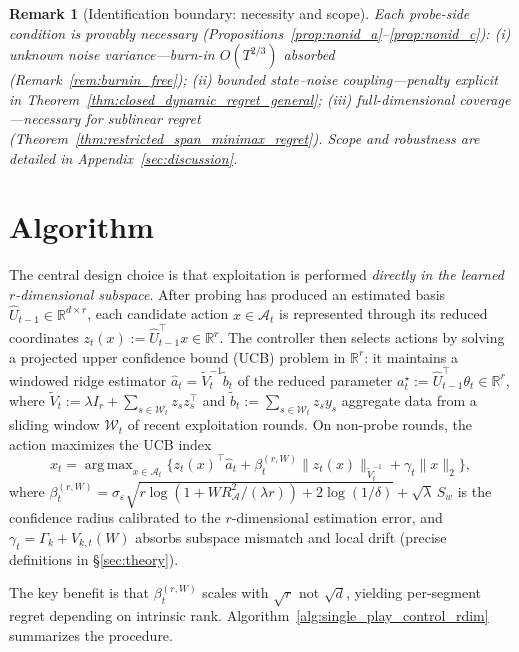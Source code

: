 \documentclass{article}
\newcommand{\R}{\mathbb{R}}
\newcommand{\cA}{\mathcal{A}}
\DeclareMathOperator*{\argmax}{arg\,max}
\newtheorem{remark}{Remark}
\begin{document}
\begin{remark}[Identification boundary: necessity and scope]
  \label{rem:necessity_compact}
  Each probe-side condition is provably necessary (Propositions~\ref{prop:nonid_a}--\ref{prop:nonid_c}):
  \emph{(i)} unknown noise variance---burn-in $O(T^{2/3})$ absorbed (Remark~\ref{rem:burnin_free});
  \emph{(ii)} bounded state--noise coupling---penalty explicit in Theorem~\ref{thm:closed_dynamic_regret_general};
  \emph{(iii)} full-dimensional coverage---necessary for sublinear regret (Theorem~\ref{thm:restricted_span_minimax_regret}).
  Scope and robustness are detailed in Appendix~\ref{sec:discussion}.
  \end{remark}



\section{Algorithm}
\label{sec:algorithm}

The central design choice is that exploitation is performed \emph{directly in the learned $r$-dimensional subspace}. After probing has produced an estimated basis $\widehat U_{t-1}\in\R^{d\times r}$, each candidate action $x\in\cA_t$ is represented through its reduced coordinates $z_t(x) := \widehat U_{t-1}^\top x \in \R^r.$
The controller then selects actions by solving a projected upper confidence bound (UCB) problem in $\R^r$: it maintains a windowed ridge estimator $\widehat a_t = \widetilde V_t^{-1}\widetilde b_t$ of the reduced parameter $a_t^\star := \widehat U_{t-1}^\top \theta_t \in \R^r$, where $\widetilde V_t := \lambda I_r + \sum_{s \in \mathcal{W}_t} z_s z_s^\top$ and $\widetilde b_t := \sum_{s \in \mathcal{W}_t} z_s y_s$ aggregate data from a sliding window $\mathcal{W}_t$ of recent exploitation rounds. On non-probe rounds, the action maximizes the UCB index
\[
x_t = \argmax_{x \in \cA_t}\bigl\{z_t(x)^\top \widehat a_t + \beta_t^{(r,W)}\|z_t(x)\|_{\widetilde V_t^{-1}} + \gamma_t\|x\|_2\bigr\},
\]
where $\beta_t^{(r,W)} = \sigma_\varepsilon\sqrt{r\log(1 + WR_{\cA}^2/(\lambda r)) + 2\log(1/\delta)} + \sqrt{\lambda}\,S_w$ is the confidence radius calibrated to the $r$-dimensional estimation error, and $\gamma_t = \Gamma_k + V_{k,t}(W)$ absorbs subspace mismatch and local drift (precise definitions in \S\ref{sec:theory}).

The key benefit is that $\beta_t^{(r,W)}$ scales with $\sqrt{r}$ not $\sqrt{d}$, yielding per-segment regret depending on intrinsic rank. Algorithm~\ref{alg:single_play_control_rdim} summarizes the procedure.
\end{document}
